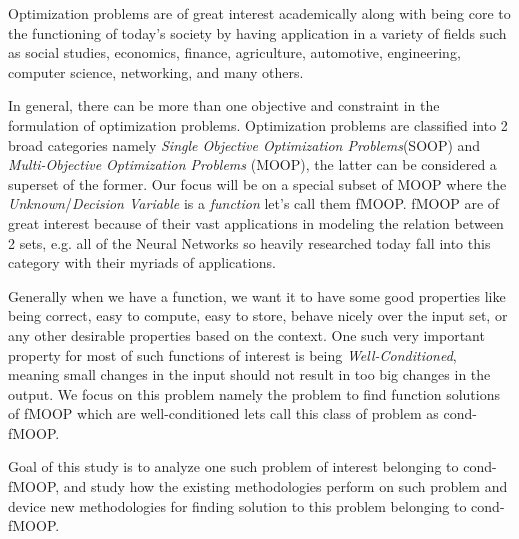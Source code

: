 
\hspace{1cm}Optimization problems are of great interest academically along with being core to the functioning of today's society by having application in a variety of fields such as social studies, economics, finance, agriculture, automotive, engineering, computer science, networking, and many others.

In general, there can be more than one objective and constraint in the formulation of optimization problems. Optimization problems are classified into 2 broad categories namely \textit{Single Objective Optimization Problems}(SOOP) and \textit{Multi-Objective Optimization Problems} (MOOP), the latter can be considered a superset of the former. Our focus will be on a special subset of MOOP where the \textit{Unknown}/\textit{Decision Variable} is a \textit{function} let's call them fMOOP. fMOOP are of great interest because of their vast applications in modeling the relation between 2 sets, e.g. all of the Neural Networks so heavily researched today fall into this category with their myriads of applications.

Generally when we have a function, we want it to have some good properties like being correct, easy to compute, easy to store, behave nicely over the input set, or any other desirable properties based on the context. One such very important property for most of such functions of interest is being \textit{Well-Conditioned}, meaning small changes in the input should not result in too big changes in the output. We focus on this problem namely the problem to find function solutions of fMOOP which are well-conditioned lets call this class of problem as cond-fMOOP.

Goal of this study is to analyze one such problem of interest belonging to cond-fMOOP, and study how the existing methodologies perform on such problem and device new methodologies for finding solution to this problem belonging to cond-fMOOP.


